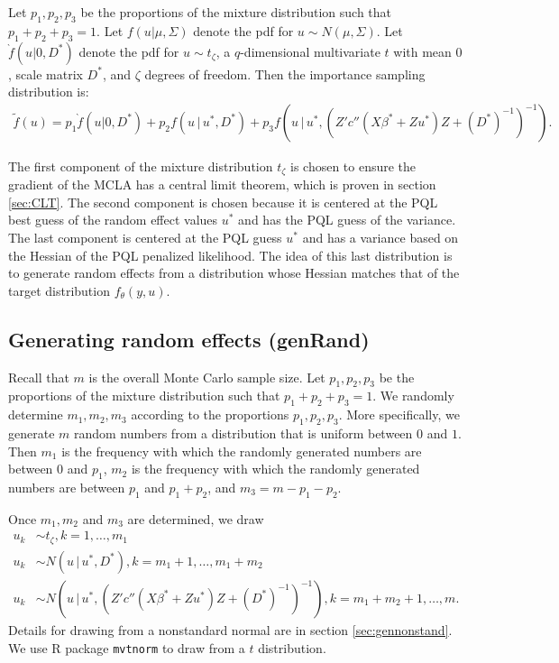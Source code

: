 \documentclass{article}
\begin{document}
Let $p_1,p_2,p_3$ be the proportions of the mixture distribution such that  $p_1+p_2+p_3=1$.  Let $f(u|\mu,\Sigma)$ denote the pdf for $u \sim N(\mu,\Sigma)$.  Let $\grave{f}(u|0,D^*)$ denote the pdf for $u \sim t_\zeta$, a $q$-dimensional multivariate  $t$ with mean $0$, scale matrix $D^*$, and $\zeta$ degrees of freedom. Then the importance sampling distribution is:
\begin{align}
 \tilde{f}(u) = p_1  \grave{f}(u|0,D^*)+p_2  f(u \, | \, u^*, D^*)+p_3  f(u \, | \, u^*, (Z'  c''(X \beta^*+Zu^*) Z +(D^*)^{-1}   )^{-1}). \label{eq:ftwiddle}
\end{align}


The first component of the mixture distribution $t_\zeta$ is chosen to ensure  the gradient of the MCLA has a central limit theorem, which is proven in  section \ref{sec:CLT}.  The second component is chosen because it is centered at the PQL best guess of the random effect values $u^*$ and  has the PQL guess of the variance. The last component is centered at the PQL guess $u^*$ and has a variance based on the Hessian of the PQL penalized likelihood.  The idea of this last distribution is to generate random effects from a distribution whose Hessian matches that of the target distribution $f_\theta(y,u)$.

\subsection{Generating random effects (genRand)}\label{sec:genRand}

 Recall that $m$ is the overall Monte Carlo sample size.  Let $p_1,p_2,p_3$ be the proportions of the mixture distribution such that  $p_1+p_2+p_3=1$. We randomly determine $m_1,m_2,m_3$ according to the proportions $p_1,p_2,p_3$. More specifically, we generate $m$ random numbers from a distribution that is uniform between $0$ and $1$. Then $m_1$ is the frequency with which the randomly generated numbers are between $0$ and $p_1$,  $m_2$ is the frequency with which the randomly generated numbers are between $p_1$ and $p_1+p_2$, and $m_3=m-p_1-p_2$.

Once $m_1, m_2$ and $m_3$ are determined, we draw 
\begin{align}
u_k &\sim t_\zeta ,k=1,\ldots,m_1\\
u_k &\sim N(u \, | \, u^*, D^*) ,k=m_1+1,\ldots,m_1+m_2\\
u_k &\sim N(u \, | \, u^*, (Z'  c''(X \beta^*+Zu^*) Z +(D^*)^{-1}   )^{-1}) ,k=m_1+m_2+1,\ldots,m.
\end{align}
Details for drawing from a nonstandard normal are in section \ref{sec:gennonstand}. We use R package \texttt{mvtnorm} to draw from a $t$ distribution.
 
\end{document}
